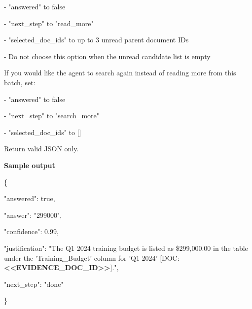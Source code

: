 \begin{tcolorbox}
\begin{scriptsize}
- "answered" to false\par
- "next\_step" to "read\_more"\par
- "selected\_doc\_ids" to up to 3 unread parent document IDs\par
- Do not choose this option when the unread candidate list is empty\par
\mbox{}\par
If you would like the agent to search again instead of reading more from this batch, set:\par
- "answered" to false\par
- "next\_step" to "search\_more"\par
- "selected\_doc\_ids" to []\par
\mbox{}\par
Return valid JSON only.\par
\medskip
\normalfont\textbf{Sample output}\par
\ttfamily
\{\par
  "answered": true,\par
  "answer": "299000",\par
  "confidence": 0.99,\par
  "justification": "The Q1 2024 training budget is listed as \$299,000.00 in the table under the 'Training\_Budget' column for 'Q1 2024' [DOC:\textcolor{my-green}{\textbf{\textless{}\textless{}EVIDENCE\_DOC\_ID\textgreater{}\textgreater{}}}].",\par
  "next\_step": "done"\par
\}\par
\end{scriptsize}
\end{tcolorbox}

